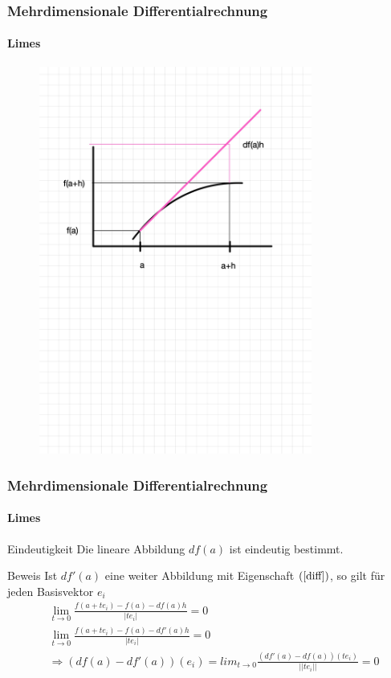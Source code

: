 \documentclass{beamer}
\begin{document}
\begin{frame}
    \frametitle{Mehrdimensionale Differentialrechnung}
\framesubtitle{Limes}

\begin{figure}[H]
      \centering
    \includegraphics[width=0.8\textwidth]{images/df}
\end{figure}

 \end{frame}



\begin{frame}
    \frametitle{Mehrdimensionale Differentialrechnung}
\framesubtitle{Limes}
    \begin{block}{Eindeutigkeit}
Die lineare Abbildung $df(a)$ ist eindeutig bestimmt.
\end{block}
    \begin{block}{Beweis}
Ist $df'(a)$ eine weiter Abbildung mit Eigenschaft $(\ref{diff})$, so gilt für jeden Basisvektor $e_i$
\begin{align}
& \lim_{t \to 0} \frac{f(a+te_i) - f(a) - df(a)h }{|t e_i|} = 0 \\
 & \lim_{t \to 0} \frac{f(a+te_i) - f(a) - df'(a)h }{|t e_i|}  = 0\\
& \Rightarrow (df(a) - df'(a))(e_i) = lim_{t \to 0}\frac{(df'(a) - df(a))(t e_i)}{||te_i||} = 0
\end{align}
\end{block}
 \end{frame}
\end{document}
